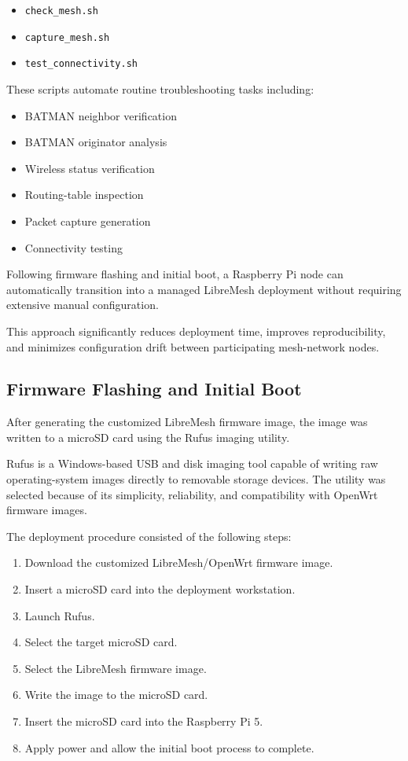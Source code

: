 \documentclass[conference]{IEEEtran}
\begin{document}
\begin{itemize}
    \item \texttt{check\_mesh.sh}
    \item \texttt{capture\_mesh.sh}
    \item \texttt{test\_connectivity.sh}
\end{itemize}

These scripts automate routine troubleshooting tasks including:

\begin{itemize}
    \item BATMAN neighbor verification
    \item BATMAN originator analysis
    \item Wireless status verification
    \item Routing-table inspection
    \item Packet capture generation
    \item Connectivity testing
\end{itemize}

Following firmware flashing and initial boot, a Raspberry Pi node can automatically transition into a managed LibreMesh deployment without requiring extensive manual configuration.

This approach significantly reduces deployment time, improves reproducibility, and minimizes configuration drift between participating mesh-network nodes.

\subsection{Firmware Flashing and Initial Boot}

After generating the customized LibreMesh firmware image, the image was written to a microSD card using the Rufus imaging utility.

Rufus is a Windows-based USB and disk imaging tool capable of writing raw operating-system images directly to removable storage devices. The utility was selected because of its simplicity, reliability, and compatibility with OpenWrt firmware images.

The deployment procedure consisted of the following steps:

\begin{enumerate}
    \item Download the customized LibreMesh/OpenWrt firmware image.
    \item Insert a microSD card into the deployment workstation.
    \item Launch Rufus.
    \item Select the target microSD card.
    \item Select the LibreMesh firmware image.
    \item Write the image to the microSD card.
    \item Insert the microSD card into the Raspberry Pi 5.
    \item Apply power and allow the initial boot process to complete.
\end{enumerate}
\end{document}
